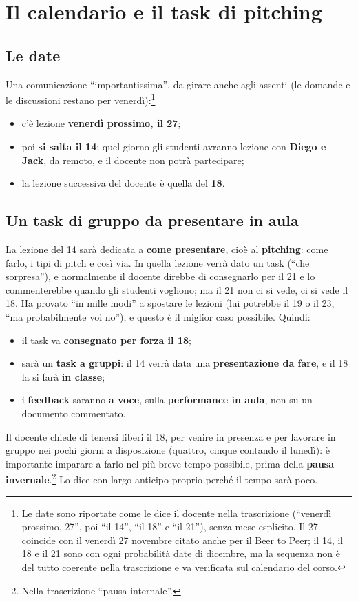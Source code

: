 \section{Il calendario e il task di pitching}
\label{gd15:sec:calendario}

\subsection{Le date}

Una comunicazione ``importantissima'', da girare anche agli assenti (le
domande e le discussioni restano per venerdì):\footnote{Le date sono
riportate come le dice il docente nella trascrizione (``venerdì prossimo,
27'', poi ``il 14'', ``il 18'' e ``il 21''), senza mese esplicito. Il 27
coincide con il venerdì 27 novembre citato anche per il Beer to Peer; il 14,
il 18 e il 21 sono con ogni probabilità date di dicembre, ma la sequenza non
è del tutto coerente nella trascrizione e va verificata sul calendario del
corso.}
\begin{itemize}
  \item c'è lezione \textbf{venerdì prossimo, il 27};
  \item poi \textbf{si salta il 14}: quel giorno gli studenti avranno
        lezione con \textbf{Diego e Jack}, da remoto, e il docente non potrà
        partecipare;
  \item la lezione successiva del docente è quella del \textbf{18}.
\end{itemize}

\subsection{Un task di gruppo da presentare in aula}

La lezione del 14 sarà dedicata a \textbf{come presentare}, cioè al
\textbf{pitching}: come farlo, i tipi di pitch e così via. In quella lezione
verrà dato un task (``che sorpresa''), e normalmente il docente direbbe di
consegnarlo per il 21 e lo commenterebbe quando gli studenti vogliono; ma il
21 non ci si vede, ci si vede il 18. Ha provato ``in mille modi'' a spostare
le lezioni (lui potrebbe il 19 o il 23, ``ma probabilmente voi no''), e
questo è il miglior caso possibile. Quindi:
\begin{itemize}
  \item il task va \textbf{consegnato per forza il 18};
  \item sarà un \textbf{task a gruppi}: il 14 verrà data una
        \textbf{presentazione da fare}, e il 18 la si farà \textbf{in
        classe};
  \item i \textbf{feedback} saranno \textbf{a voce}, sulla
        \textbf{performance in aula}, non su un documento commentato.
\end{itemize}
Il docente chiede di tenersi liberi il 18, per venire in presenza e per
lavorare in gruppo nei pochi giorni a disposizione (quattro, cinque contando
il lunedì): è importante imparare a farlo nel più breve tempo possibile,
prima della \textbf{pausa invernale}.\footnote{Nella trascrizione ``pausa
internale''.} Lo dice con largo anticipo proprio perché il tempo sarà poco.

